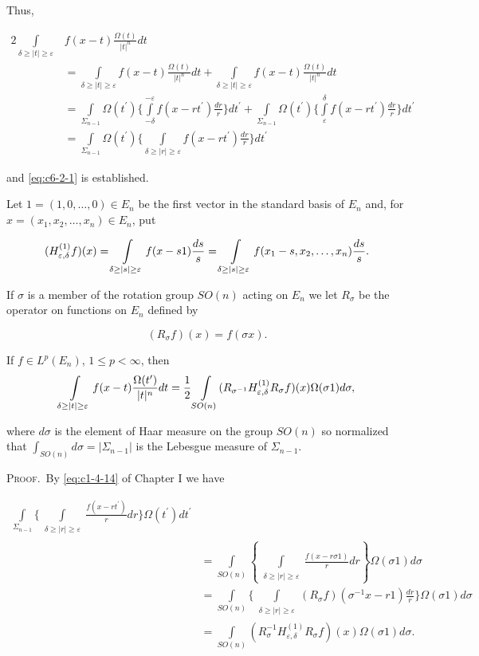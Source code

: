 Thus,

\[
\begin{aligned}2\int\limits_{\delta\geq|t|\geq\varepsilon}&f(x-t)\frac{\Omega(t)}{|t|^{n}}dt\\&=\int\limits_{\delta\geq|t|\geq\varepsilon}f(x-t)\frac{\Omega(t)}{|t|^{n}}dt+\int\limits_{\delta\geq|t|\geq\varepsilon}f(x-t)\frac{\Omega(t)}{|t|^{n}}dt\\&=\int\limits_{\Sigma_{n-1}}\Omega(t^{\prime})\Biggl\{\int\limits_{-\delta}^{-\varepsilon}f(x-rt^{\prime})\frac{dr}{r}\Biggr\}dt^{\prime}+\int\limits_{\Sigma_{n-1}}\Omega(t^{\prime})\Biggl\{\int\limits_{\varepsilon}^{\delta}f(x-rt^{\prime})\frac{dr}{r}\Biggr\}dt^{\prime}\\&=\int\limits_{\Sigma_{n-1}}\Omega(t^{\prime})\Biggl\{\int\limits_{\delta\geq|r|\geq\varepsilon}f(x-rt^{\prime})\frac{dr}{r}\Biggr\}dt^{\prime}\end{aligned}
\]

and \eqref{eq:c6-2-1} is established.

Let $1 = (1, 0, \ldots, 0) \in E_n$ be the first vector in the standard basis of $E_n$ and, for $x = (x_1, x_2, \ldots, x_n) \in E_n$, put

\[
(H_{\varepsilon,\delta}^{(1)}f)(x)=\intop_{\delta\ge|s|\ge\varepsilon}f(x-s1)\frac{d s}{s}=\intop_{\delta\ge|s|\ge\varepsilon}f(x_{1}-s,x_{2},\ldots,x_{n})\frac{d s}{s}.
\]

If $\sigma$ is a member of the rotation group $SO(n)$ acting on $E_n$ we let $R_\sigma$ be the operator on functions on $E_n$ defined by

\[
(R_{\sigma}f)(x)=f(\sigma x).
\]

\begin{lemma}
\label{lem:c6-2-2}
If $f \in L^{p}(E_{n})$, $1 \leq p < \infty$, then
\[
\intop_{\substack{\delta\geq|t|\geq\varepsilon}}f(x-t)\frac{\Omega(t^{\prime})}{|t|^{n}}d t=\frac{1}{2}\intop_{S O(n)}(R_{\sigma^{-1}}H_{\varepsilon,\delta}^{(1)}R_{\sigma}f)(x)\Omega(\sigma1)d\sigma,
\]

where $d\sigma$ is the element of Haar measure on the group $SO(n)$ so normalized that $\int_{SO(n)} d\sigma = |\Sigma_{n-1}|$ is the Lebesgue measure of $\Sigma_{n-1}$.
\end{lemma}

\textsc{Proof.}\ By \eqref{eq:c1-4-14} of Chapter I we have

\[
\begin{aligned}\int\limits_{\Sigma_{n-1}}\Bigg\{\int\limits_{\substack{\delta\geq|r|\geq\varepsilon}}\frac{f(x-rt^{\prime})}{r}dr\Bigg\}\Omega(t^{\prime})dt^{\prime}\\&=\int\limits_{SO(n)}\left\{\int\limits_{\substack{\delta\geq|r|\geq\varepsilon}}\frac{f(x-r\sigma1)}{r}dr\right\}\Omega(\sigma1)d\sigma\\&=\int\limits_{SO(n)}\Bigg\{\int\limits_{\substack{\delta\geq|r|\geq\varepsilon}}(R_\sigma f)(\sigma^{-1}x-r1)\frac{dr}{r}\Bigg\}\Omega(\sigma1)d\sigma\\&=\int\limits_{SO(n)}(R_\sigma^{-1}H^{(1)}_{\varepsilon,\delta}R_\sigma f)(x)\Omega(\sigma1)d\sigma.\end{aligned}
\]


